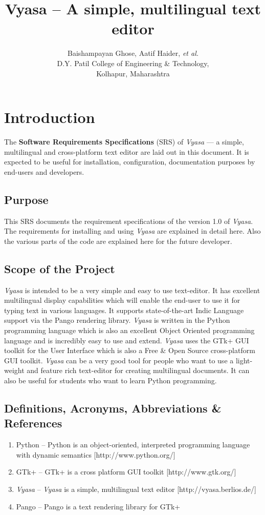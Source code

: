 \documentclass[12pt,a4paper]{article}
\title {Vyasa -- A simple, multilingual text editor}
\author {Baishampayan Ghose, Aatif Haider, \textit{et al.} \\ D.Y. Patil College of Engineering \&{} Technology,
\\ Kolhapur, Maharashtra}
\newcommand{\VS}{\textit{Vyasa}}
\begin{document}
\tableofcontents


\section{Introduction}
The {\bfseries Software Requirements Specifications} (SRS) of
\VS{} --- a simple, multilingual and cross-platform text editor
are laid out in this document. It is expected to be useful for
installation, configuration, documentation purposes by end-users and developers.

\subsection{Purpose}
This SRS documents the requirement specifications of the version 1.0 of
\VS. The requirements for installing and using \VS{} are explained in
detail here. Also the various parts of the code are explained here for
the future developer.

\subsection{Scope of the Project}
\VS{} is intended to be a very simple and easy to use text-editor. It
has excellent multilingual display capabilities which will enable the
end-user to use it for typing text in various languages. It supports
state-of-the-art Indic Language support via the Pango rendering
library. \VS{} is written in the Python programming language which is
also an excellent Object Oriented programming language and is incredibly
easy to use and extend. \VS{} uses the GTk+ GUI toolkit for the User
Interface which is also a Free \&{} Open Source cross-platform GUI
toolkit.
\VS{} can be a very good tool for people who want to use a light-weight
and feature rich text-editor for creating multilingual documents. It can
also be useful for students who want to learn Python programming.

\subsection{Definitions, Acronyms, Abbreviations \&{} References}
\begin{enumerate}
\item Python -- Python is an object-oriented, interpreted programming
  language with dynamic semantics [http://www.python.org/]
\item GTk+ -- GTk+ is a cross platform GUI toolkit [http://www.gtk.org/]
\item \VS{} -- \VS{} is a simple, multilingual text editor
  [http://vyasa.berlios.de/]
\item Pango -- Pango is a text rendering library for GTk+
\end{enumerate}
\end{document}
